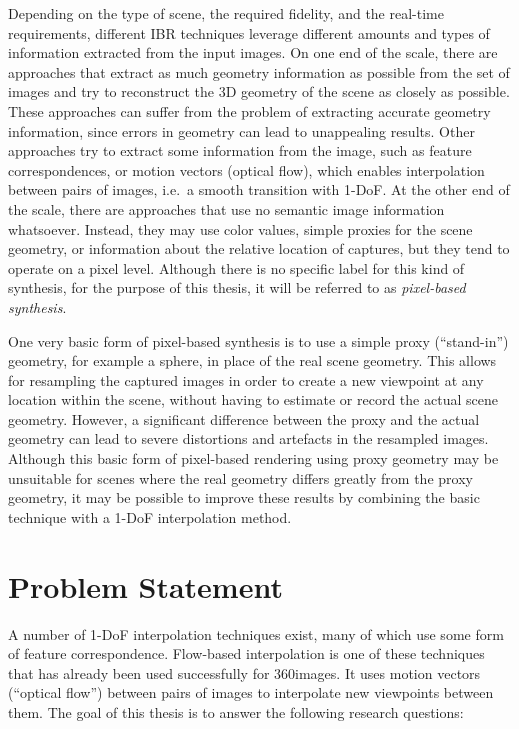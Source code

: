 Depending on the type of scene, the required fidelity, and the real-time requirements, different IBR techniques leverage different amounts and types of information extracted from the input images. On one end of the scale, there are approaches that extract as much geometry information as possible from the set of images and try to reconstruct the 3D geometry of the scene as closely as possible. These approaches can suffer from the problem of extracting accurate geometry information, since errors in geometry can lead to unappealing results.
Other approaches try to extract some information from the image, such as feature correspondences, or motion vectors (optical flow), which enables interpolation between pairs of images, i.e.\ a smooth transition with 1-DoF.
At the other end of the scale, there are approaches that use no semantic image information whatsoever. Instead, they may use color values, simple proxies for the scene geometry, or information about the relative location of captures, but they tend to operate on a pixel level. Although there is no specific label for this kind of synthesis, for the purpose of this thesis, it will be referred to as \emph{pixel-based synthesis}.

One very basic form of pixel-based synthesis is to use a simple proxy (``stand-in'') geometry, for example a sphere, in place of the real scene geometry\footnotemark. This allows for resampling the captured images in order to create a new viewpoint at any location within the scene, without having to estimate or record the actual scene geometry. However, a significant difference between the proxy and the actual geometry can lead to severe distortions and artefacts in the resampled images. Although this basic form of pixel-based rendering using proxy geometry may be unsuitable for scenes where the real geometry differs greatly from the proxy geometry, it may be possible to improve these results by combining the basic technique with a 1-DoF interpolation method.

\section*{Problem Statement}
A number of 1-DoF interpolation techniques exist, many of which use some form of feature correspondence. Flow-based interpolation is one of these techniques that has already been used successfully for 360\degree images. It uses motion vectors (``optical flow'') between pairs of images to interpolate new viewpoints between them. The goal of this thesis is to answer the following research questions:

